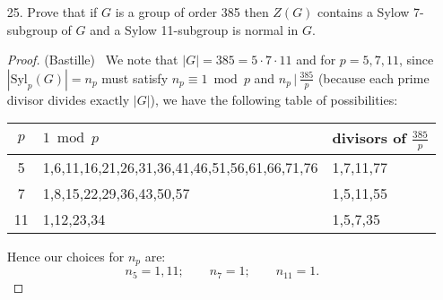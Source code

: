 \documentclass[10pt]{article}
\newcommand{\divides}{\, \Big | \,}
\begin{document}
\begin{itemize}
\begin{proof}
On the other hand, suppose that $n_{2},n_{3},n_{11}\ne1$. Then, by
the list of candidates above, we have that $n_{11}=12$. By the same
counting argument as in Problem 21, we thus have that there are $10\cdot12=120$
elements of order 11 in $G$. We can therefore exclude exclude that
$n_{3}=22$, since that would imply that $\left|G\right|\ge2\cdot22+120=142$.
Thus, $n_{3}=4$, and so we have $8$ elements of order 3, leaving
3 non-identity elements to choose from for elements in our Sylow 2-subgroups.
Since each Sylow 2-subgroup has order 4, that implies that we have
a unique subgroup of order 4, contradicting that $n_{2}\ne1$. We
can therefore conclude that at least one of $n_{2},n_{3},n_{11}$
is 1, and so we are done.
\end{proof}


\item[25.] Prove that if $G$ is a group of order 385 then $Z(G)$ contains a Sylow 7-subgroup of $G$ and a Sylow 11-subgroup is normal in $G$.
\begin{proof} (Bastille) \ We note that $|G|=385= 5 \cdot 7 \cdot 11$ and for $p=5,7,11$, since $|\text{Syl}_p(G)|=n_p$ must satisfy $n_p \equiv 1 \bmod{p}$ and $n_p \divides \frac{385}{p}$ (because each prime divisor divides exactly $|G|$), we have the following table of possibilities:
\begin{center}
\begin{tabular}{c|l|l}
$p$ & $1 \bmod{p}$ & divisors of  $\frac{385}{p}$ \\
\hline
5 & 1,6,11,16,21,26,31,36,41,46,51,56,61,66,71,76 & 1,7,11,77 \\
7 & 1,8,15,22,29,36,43,50,57 & 1,5,11,55 \\
11 & 1,12,23,34 & 1,5,7,35
\end{tabular}
\end{center}
Hence our choices for $n_p$ are:
\begin{equation*}
n_5=1,11; \qquad n_7=1; \qquad n_{11}=1.
\end{equation*}


\end{proof}
\end{itemize}
\end{document}
